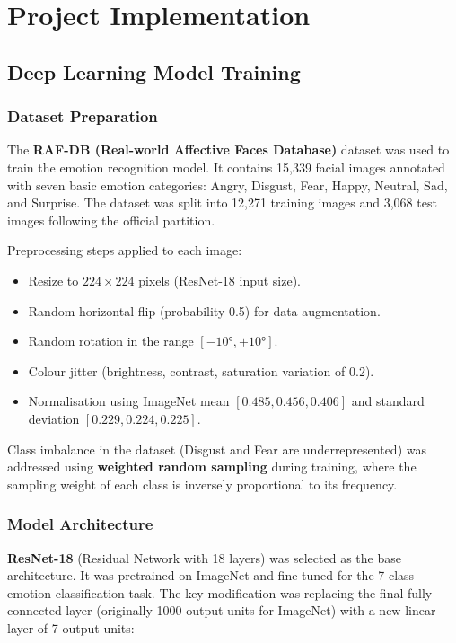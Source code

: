 \chapter{Project Implementation}


\section{Deep Learning Model Training}

\subsection{Dataset Preparation}

The \textbf{RAF-DB (Real-world Affective Faces Database)} dataset was used to
train the emotion recognition model. It contains 15,339 facial images
annotated with seven basic emotion categories: Angry, Disgust, Fear, Happy,
Neutral, Sad, and Surprise. The dataset was split into 12,271 training images
and 3,068 test images following the official partition.

Preprocessing steps applied to each image:
\begin{itemize}
    \item Resize to $224 \times 224$ pixels (ResNet-18 input size).
    \item Random horizontal flip (probability 0.5) for data augmentation.
    \item Random rotation in the range $[-10°, +10°]$.
    \item Colour jitter (brightness, contrast, saturation variation of 0.2).
    \item Normalisation using ImageNet mean $[0.485, 0.456, 0.406]$ and
          standard deviation $[0.229, 0.224, 0.225]$.
\end{itemize}

Class imbalance in the dataset (Disgust and Fear are underrepresented) was
addressed using \textbf{weighted random sampling} during training, where the
sampling weight of each class is inversely proportional to its frequency.

\subsection{Model Architecture}

\textbf{ResNet-18} (Residual Network with 18 layers) was selected as the
base architecture. It was pretrained on ImageNet and fine-tuned for the
7-class emotion classification task. The key modification was replacing the
final fully-connected layer (originally 1000 output units for ImageNet) with
a new linear layer of 7 output units:


